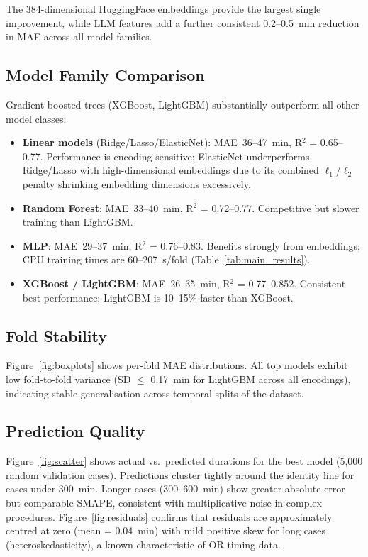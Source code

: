 \documentclass[11pt,twocolumn]{article}
\begin{document}
The 384-dimensional HuggingFace embeddings provide the largest single improvement,
while LLM features add a further consistent 0.2--0.5~min reduction in MAE across
all model families.

\subsection{Model Family Comparison}

Gradient boosted trees (XGBoost, LightGBM) substantially outperform all other
model classes:
\begin{itemize}
  \item \textbf{Linear models} (Ridge/Lasso/ElasticNet): MAE~36--47~min,
        R$^2$ = 0.65--0.77.  Performance is encoding-sensitive; ElasticNet
        underperforms Ridge/Lasso with high-dimensional embeddings due to its
        combined $\ell_1$/$\ell_2$ penalty shrinking embedding dimensions
        excessively.
  \item \textbf{Random Forest}: MAE~33--40~min, R$^2$ = 0.72--0.77.
        Competitive but slower training than LightGBM.
  \item \textbf{MLP}: MAE~29--37~min, R$^2$ = 0.76--0.83.  Benefits strongly
        from embeddings; CPU training times are 60--207~s/fold (Table~\ref{tab:main_results}).
  \item \textbf{XGBoost / LightGBM}: MAE~26--35~min, R$^2$ = 0.77--0.852.
        Consistent best performance; LightGBM is 10--15\% faster than XGBoost.
\end{itemize}

\subsection{Fold Stability}

Figure~\ref{fig:boxplots} shows per-fold MAE distributions.  All top models
exhibit low fold-to-fold variance (SD $\leq$ 0.17~min for LightGBM across all
encodings), indicating stable generalisation across temporal splits of the dataset.

\subsection{Prediction Quality}

Figure~\ref{fig:scatter} shows actual vs.\ predicted durations for the best model
(5,000 random validation cases).  Predictions cluster tightly around the identity
line for cases under 300~min.  Longer cases (300--600~min) show greater absolute
error but comparable SMAPE, consistent with multiplicative noise in complex
procedures.  Figure~\ref{fig:residuals} confirms that residuals are approximately
centred at zero (mean = 0.04~min) with mild positive skew for long cases
(heteroskedasticity), a known characteristic of OR timing data.
\end{document}
